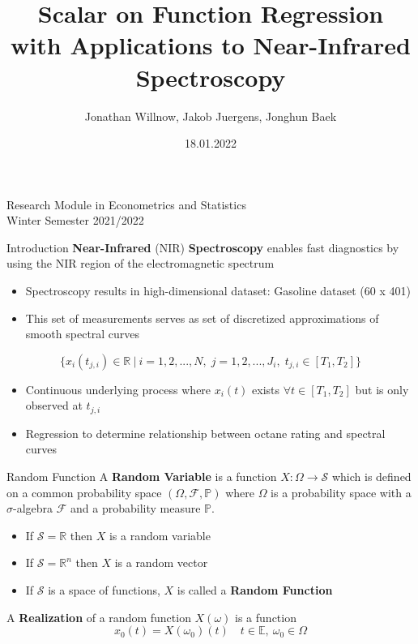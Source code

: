 \documentclass{beamer}
\title{Scalar on Function Regression \\
with Applications to Near-Infrared Spectroscopy}
\author{Jonathan Willnow, Jakob Juergens, Jonghun Baek}
\date{18.01.2022}
\begin{document}
	
	\begin{frame}
		\titlepage 
		\begin{center}
			{\small
			Research Module in Econometrics and Statistics \\
			Winter Semester 2021/2022}
		\end{center}
	\end{frame}
	
	\logo{}
	
	\begin{frame}{Introduction}
		\textbf{Near-Infrared} (NIR) \textbf{Spectroscopy} enables fast diagnostics by using the NIR region of the electromagnetic spectrum
		\begin{itemize}
			\item Spectroscopy results in high-dimensional dataset: Gasoline dataset (60 x 401)
			\item This set of measurements serves as set of discretized approximations of smooth spectral curves
		\end{itemize}
		\vspace{0.1cm}
		$$\{x_{i}(t_{j,i}) \in \mathbb{R} \: \vert \: i = 1,2,...,N, \; j = 1,2,..., J_i, \; t_{j,i} \in [T_1, T_2] \}$$
	
		\begin{itemize}
			\item Continuous underlying process where $x_i(t)$ exists $\forall t \in [T_1, T_2]$ but is only observed at $t_{j,i}$
			\item Regression to determine relationship between octane rating and spectral curves
		\end{itemize}
		
	\end{frame}

	 \begin{frame}{Random Function}
		A \textbf{Random Variable} is a function $X : \Omega \rightarrow
		\mathcal{S}$ which is defined on a common probability space $(\Omega,
		\mathcal{F}, \mathbb{P})$ where $\Omega$ is a probability space with a
		$\sigma$-algebra $\mathcal{F}$ and a probability measure $\mathbb{{P}}.$
		\vspace{0.2cm}
		
		\begin{itemize}
			\item If $\mathcal{S} = \mathbb{R}$ then $X$ is a random variable
			\item If $\mathcal{S} = \mathbb{R}^{n}$ then $X$ is a random
			vector
			\item If $\mathcal{S}$ is a space of functions, $X$ is called a
			\textbf{Random Function}
		\end{itemize}
		\vspace{0.2cm}
		
		A \textbf{Realization} of a random function $X(\omega)$ is a function 
		$$x_0(t) = X(\omega_0)(t) \quad t \in \mathbb{E}, \: \omega_0 \in \Omega$$
	\end{frame}
	
\end{document}
